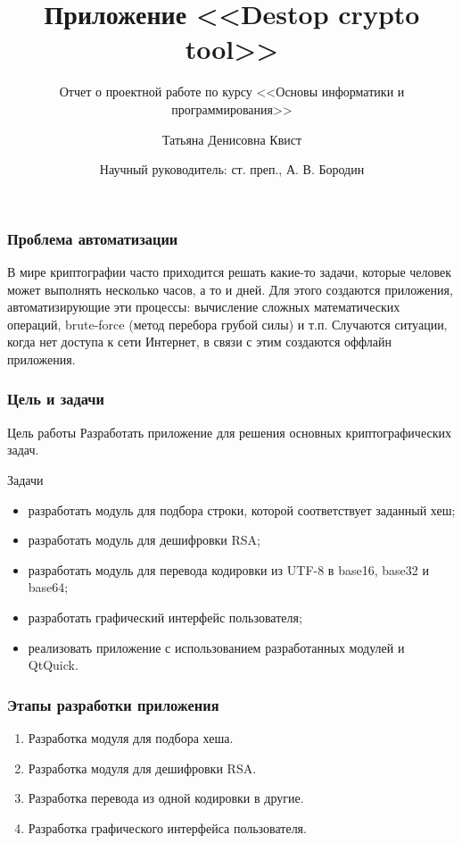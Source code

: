 \documentclass[hyperref={unicode}]{beamer}
\title[%
]{%
    Приложение <<Destop crypto tool>>
}
\subtitle{Отчет о проектной работе по курсу <<Основы информатики и программирования>>}
\author[%
    Татьяна Квист
]{%
    Татьяна Денисовна Квист
}
\date[%
    28.05.2021
]{%
    Научный руководитель: ст. преп., А. В. Бородин
}
\institute[%
    ПетрГУ
]{%
    Петрозаводский государственный университет\\
    Кафедра информатики и математического обеспечения
}
\begin{document}
\begin{frame}
\maketitle
\end{frame}

\begin{frame}
  \frametitle{Проблема автоматизации}
  В мире криптографии часто приходится решать какие-то задачи, которые человек может выполнять несколько часов, а то и дней. Для этого создаются приложения, автоматизирующие эти процессы: вычисление сложных математических операций, brute-force (метод перебора грубой силы) и т.п. Случаются ситуации, когда нет доступа к сети Интернет, в связи с этим создаются оффлайн приложения.
\end{frame}

\begin{frame}
  \frametitle{Цель и задачи}
  \begin{block}{Цель работы}
    Разработать приложение для решения основных криптографических задач.
  \end{block}
  \begin{block}{Задачи}
  \begin{itemize}
    \item разработать модуль для подбора строки, которой соответствует заданный хеш;
    \item разработать модуль для дешифровки RSA;
    \item разработать модуль для перевода кодировки из UTF-8 в base16, base32 и base64;
    \item разработать графический интерфейс пользователя;
    \item реализовать приложение с использованием разработанных модулей и QtQuick.
  \end{itemize}
  \end{block}
\end{frame}

\begin{frame}
    \frametitle{Этапы разработки приложения}
    \begin{enumerate}
        \item Разработка модуля для подбора хеша.
        \item Разработка модуля для дешифровки RSA.
        \item Разработка перевода из одной кодировки в другие.
        \item Разработка графического интерфейса пользователя.
    \end{enumerate}
\end{frame}
  
\end{document}
